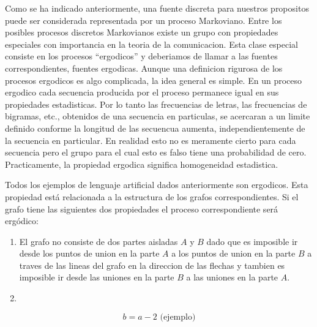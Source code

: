 Como se ha indicado anteriormente, una fuente discreta para nuestros
propositos puede ser considerada representada por un proceso
Markoviano. Entre los posibles procesos discretos Markovianos existe
un grupo con propiedades especiales con importancia en la teoria de la
comunicacion. Esta clase especial consiste en los procesos
``ergodicos'' y deberiamos de llamar a las fuentes correspondientes,
fuentes ergodicas. Aunque una definicion rigurosa de los procesos
ergodicos es algo complicada, la idea general es simple. En un proceso
ergodico cada secuencia producida por el proceso permanece igual en
sus propiedades estadisticas. Por lo tanto las frecuencias de letras,
las frecuencias de bigramas, etc., obtenidos de una secuencia en
particulas, se acercaran a un limite definido conforme la longitud de
las secuencua aumenta, independientemente de la secuencia en
particular. En realidad esto no es meramente cierto para cada
secuencia pero el grupo para el cual esto es falso tiene una
probabilidad de cero. Practicamente, la propiedad ergodica significa
homogeneidad estadistica.

Todos los ejemplos de lenguaje artificial dados anteriormente son
ergodicos. Esta propiedad est\'{a} relacionada a la estructura de los
grafos correspondientes. Si el grafo tiene las siguientes dos
propiedades el proceso correspondiente ser\'{a} erg\'{o}dico:

\begin{enumerate}
   \item El grafo no consiste de dos partes aisladas $A$ y $B$ dado que es
   imposible ir desde los puntos de union en la parte $A$ a los puntos
   de union en la parte $B$ a traves de las lineas del grafo en la
   direccion de las flechas y tambien es imposible ir desde las
   uniones en la parte $B$ a las uniones en la parte $A$.  \item
\end{enumerate}

\begin{equation}
b = a - 2 \text{ (ejemplo)}
\end{equation}

